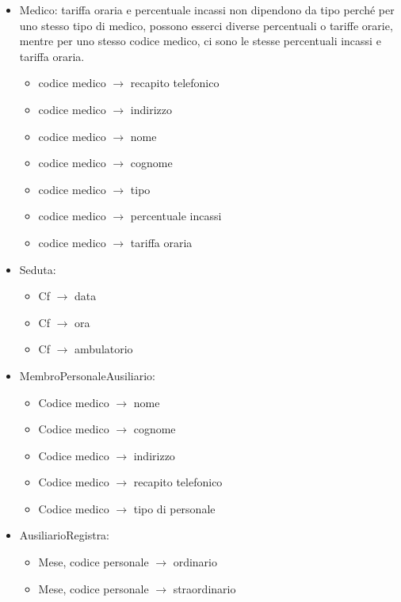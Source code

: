\documentclass[11pt]{article}
\begin{document}
\begin{itemize}
    \item Medico: tariffa oraria e percentuale incassi non dipendono da tipo perché per uno stesso tipo di medico, possono esserci diverse percentuali o tariffe orarie, mentre per uno stesso codice medico, ci sono le stesse percentuali incassi e tariffa oraria.
    \begin{itemize}
        \item codice medico $\rightarrow$ recapito telefonico
        \item codice medico $\rightarrow$ indirizzo
        \item codice medico $\rightarrow$ nome
        \item codice medico $\rightarrow$ cognome
        \item codice medico $\rightarrow$ tipo
        \item codice medico $\rightarrow$ percentuale incassi
        \item codice medico $\rightarrow$ tariffa oraria
    \end{itemize}

    \item Seduta:
    \begin{itemize}
        \item Cf $\rightarrow$ data
        \item Cf $\rightarrow$ ora
        \item Cf $\rightarrow$ ambulatorio
    \end{itemize}
    \item MembroPersonaleAusiliario:
    \begin{itemize}
        \item Codice medico $\rightarrow$ nome
        \item Codice medico $\rightarrow$ cognome
        \item Codice medico $\rightarrow$ indirizzo
        \item Codice medico $\rightarrow$ recapito telefonico
        \item Codice medico $\rightarrow$ tipo di personale
    \end{itemize}

    \item AusiliarioRegistra:
    \begin{itemize}
        \item Mese, codice personale $\rightarrow$ ordinario
        \item Mese, codice personale $\rightarrow$ straordinario
    \end{itemize}


\end{itemize}
\end{document}
